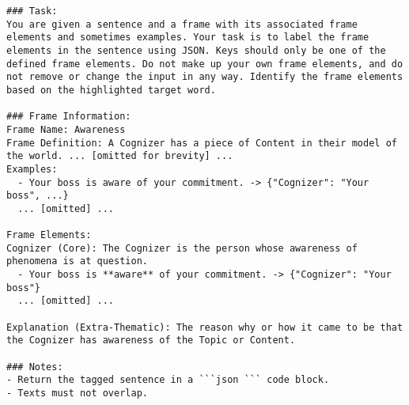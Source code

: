 \begin{lstlisting}[caption={Sample prompt used for zero-shot evaluation.}, label=lst:prompt]
### Task:
You are given a sentence and a frame with its associated frame elements and sometimes examples. Your task is to label the frame elements in the sentence using JSON. Keys should only be one of the defined frame elements. Do not make up your own frame elements, and do not remove or change the input in any way. Identify the frame elements based on the highlighted target word. 

### Frame Information:
Frame Name: Awareness
Frame Definition: A Cognizer has a piece of Content in their model of the world. ... [omitted for brevity] ...
Examples:
  - Your boss is aware of your commitment. -> {"Cognizer": "Your boss", ...}
  ... [omitted] ...

Frame Elements:
Cognizer (Core): The Cognizer is the person whose awareness of phenomena is at question. 
  - Your boss is **aware** of your commitment. -> {"Cognizer": "Your boss"}
  ... [omitted] ...

Explanation (Extra-Thematic): The reason why or how it came to be that the Cognizer has awareness of the Topic or Content.

### Notes:
- Return the tagged sentence in a ```json ``` code block.
- Texts must not overlap.

\end{lstlisting}

